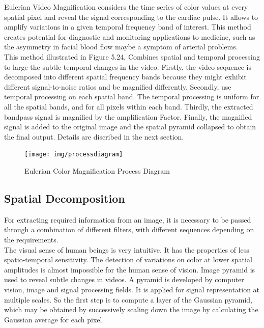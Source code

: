 Eulerian Video Magnification \cite{Rubinstein} considers the time series of color values at every spatial pixel and reveal the signal corresponding to the cardiac pulse. It allows to amplify variations in a given temporal frequency band of interest. This method creates potential for diagnostic and monitoring applications to medicine, such as the asymmetry in facial blood flow maybe a symptom of arterial problems.\\

This method illustrated in Figure 5.24, Combines spatial and temporal processing to large the subtle temporal changes in the video. Firstly, the video sequence is decomposed into different spatial frequency bands because they might exhibit different signal-to-noise ratios and be magnified differently. Secondly, use temporal processing on each spatial band. The temporal processing is uniform for all the spatial bands, and for all pixels within each band. Thirdly, the extracted
bandpass signal is magnified by the  amplification Factor. Finally, the magnified signal is added to the original image and the
spatial pyramid collapsed to obtain the final output. Details are discribed in the next section.\\
\begin{figure}[!htb]
	\centering
	\texttt{[image: img/processdiagram]}
	\caption{Eulerian Color Magnification Process Diagram}
\end{figure}


\subsection{Spatial Decomposition}
For extracting required information from an image, it is necessary to be passed through a combination of different filters, with different sequences depending on
the requirements.\\

The visual sense of human beings is very intuitive. It has the properties
of less spatio-temporal sensitivity. The detection of variations on color at lower spatial amplitudes is almost impossible for the human sense of vision. Image pyramid is used to reveal subtle changes in videos. A pyramid is developed by computer vision, image and signal processing fields. It is applied for signal representation at multiple scales. So the first step is to compute a layer of the Gaussian pyramid, which may be obtained by successively scaling down the image by calculating the Gaussian average for each pixel.\\

